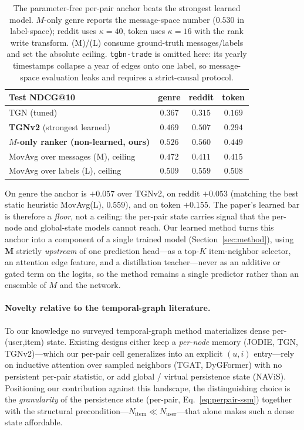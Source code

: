 \documentclass[11pt]{article}
\begin{document}
\begin{table}[h]
\centering
\begin{tabular}{lccc}
\toprule
Test NDCG@10 & genre & reddit & token \\
\midrule
TGN (tuned)                       & $0.367$ & $0.315$ & $0.169$ \\
\textbf{TGNv2} (strongest learned)& $0.469$ & $0.507$ & $0.294$ \\
\midrule
\textbf{$M$-only ranker (non-learned, ours)} & $\mathbf{0.526}$ & $\mathbf{0.560}$ & $\mathbf{0.449}$ \\
\midrule
MovAvg over messages (M), ceiling & $0.472$ & $0.411$ & $0.415$ \\
MovAvg over labels (L), ceiling   & $0.509$ & $0.559$ & $0.508$ \\
\bottomrule
\end{tabular}
\caption{The parameter-free per-pair anchor beats the strongest learned model.
$M$-only genre reports the message-space number ($0.530$ in label-space);
reddit uses $\kappa\!=\!40$, token uses $\kappa\!=\!16$ with the rank write
transform. (M)/(L) consume ground-truth messages/labels and set the absolute
ceiling. \texttt{tgbn-trade} is omitted here: its yearly timestamps collapse a
year of edges onto one label, so message-space evaluation leaks and requires a
strict-causal protocol.}
\label{tab:anchor}
\end{table}

\noindent
On genre the anchor is $+0.057$ over TGNv2, on reddit $+0.053$ (matching the
best static heuristic MovAvg(L), $0.559$), and on token $+0.155$. The paper's
learned bar is therefore a \emph{floor}, not a ceiling: the per-pair state
carries signal that the per-node and global-state models cannot reach. Our
learned method turns this anchor into a component of a single trained model
(Section~\ref{sec:method}), using $\mathbf{M}$ strictly \emph{upstream} of one
prediction head---as a top-$K$ item-neighbor selector, an attention edge
feature, and a distillation teacher---never as an additive or gated term on the
logits, so the method remains a single predictor rather than an ensemble of $M$
and the network.

\paragraph{Novelty relative to the temporal-graph literature.}
To our knowledge no surveyed temporal-graph method materializes dense
per-(user,item) state. Existing designs either keep a \emph{per-node} memory
(JODIE, TGN, TGNv2)---which our per-pair cell generalizes into an explicit
$(u,i)$ entry---rely on inductive attention over sampled neighbors (TGAT,
DyGFormer) with no persistent per-pair statistic, or add global / virtual
persistence state (NAViS). Positioning our contribution against this landscape,
the distinguishing choice is the \emph{granularity} of the persistence state
(per-pair, Eq.~\ref{eq:perpair-ssm}) together with the structural
precondition---$N_{\text{item}}\!\ll\!N_{\text{user}}$---that alone makes such a
dense state affordable.
\end{document}
